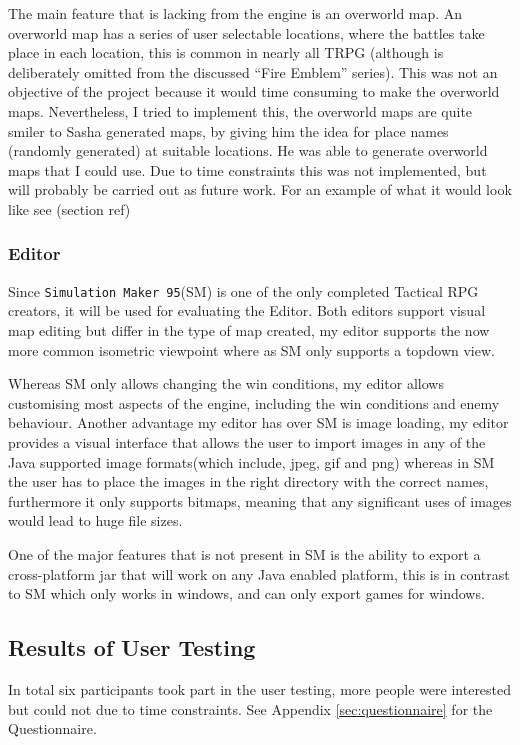 The main feature that is lacking from the engine is an overworld map. An overworld map has a series of user selectable locations, where the battles take place in each location, this is common in nearly all TRPG (although is deliberately omitted from the discussed ``Fire Emblem'' series). This was not an objective of the project because it would time consuming to make the overworld maps. Nevertheless, I tried to implement this, the overworld maps are quite smiler to  Sasha generated maps, by giving him the idea for place names (randomly generated) at suitable locations.  He was able to generate overworld maps that I could use. Due to time constraints this was not implemented, but will probably be carried out as future work. For an example of what it would look like see (section ref)

\subsubsection{Editor}
\label{ssub:editor}
Since \texttt{Simulation Maker 95}(SM) is one of the only completed Tactical RPG creators, it will be used for evaluating the Editor.  Both editors support visual map editing but differ in the type of map created,  my editor supports the now more common isometric viewpoint where as SM only supports a topdown view. 

Whereas SM only allows changing the win conditions, my editor allows customising most aspects of the engine, including the win conditions and enemy behaviour.  Another advantage my editor has over SM is image loading, my editor provides a visual interface that allows the user to import images in any of the Java supported image formats(which include, jpeg, gif and png) whereas in SM the user has to place the images in the right directory with the correct names, furthermore it only supports bitmaps, meaning that any significant uses of images would lead to huge file sizes.  

One of the major features that is not present in SM is the ability to export a cross-platform jar that will work on any Java enabled platform, this is in contrast to SM which only works in windows, and can only export games for windows.


\subsection{Results of User Testing}
\label{sub:results_of_user_testing}

In total six participants took part in the user testing, more people were interested but could not due to time constraints.  See Appendix \ref{sec:questionnaire} for the Questionnaire.

